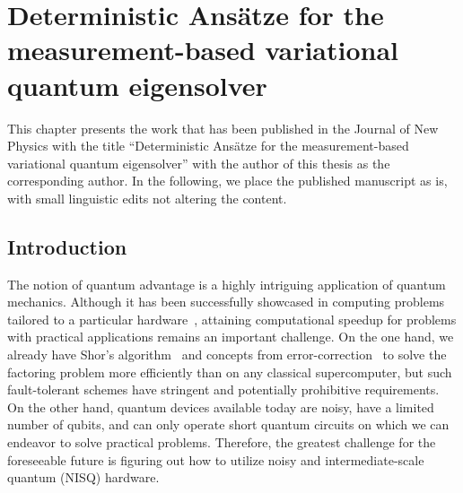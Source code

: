 \documentclass[../main.tex]{subfiles}
\begin{document}
\chapter{Deterministic Ansätze for the measurement-based variational quantum eigensolver}\label{chap:mbvqe}

This chapter presents the work that has been published in the Journal of New Physics with the title ``Deterministic Ansätze for the measurement-based variational quantum eigensolver'' \cite{schroeder2024deterministic} with the author of this thesis as the corresponding author. In the following, we place the published manuscript as is, with small linguistic edits not altering the content.

\section{Introduction}
The notion of quantum advantage is a highly intriguing application of quantum mechanics. Although it has been successfully showcased in computing problems tailored to a particular hardware~\cite{arute2019quantum,zhong2020quantum,bravyi2018quantum}, attaining computational speedup for problems with practical applications remains an important challenge. On the one hand, we already have Shor's algorithm~\cite{shor1994algorithms} and concepts from error-correction~\cite{campbell2017roads} to solve the factoring problem more efficiently than on any classical supercomputer, but such fault-tolerant schemes have stringent and potentially prohibitive requirements. On the other hand,  quantum devices available today are noisy, have a limited number of qubits, and can only operate short quantum circuits on which we can endeavor to solve practical problems. Therefore, the greatest challenge for the foreseeable future is figuring out how to utilize noisy and intermediate-scale quantum (NISQ) hardware.   
\end{document}
